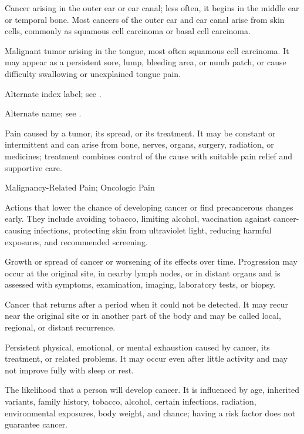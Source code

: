  Cancer arising in the outer ear or ear canal; less often, it begins in the middle ear or temporal bone. Most cancers of the outer ear and ear canal arise from skin cells, commonly as squamous cell carcinoma or basal cell carcinoma.

 Malignant tumor arising in the tongue, most often squamous cell carcinoma. It may appear as a persistent sore, lump, bleeding area, or numb patch, or cause difficulty swallowing or unexplained tongue pain.

 Alternate index label; see .

 Alternate name; see .

 Pain caused by a tumor, its spread, or its treatment. It may be constant or intermittent and can arise from bone, nerves, organs, surgery, radiation, or medicines; treatment combines control of the cause with suitable pain relief and supportive care.

\synonyms
Malignancy-Related Pain; Oncologic Pain

 Actions that lower the chance of developing cancer or find precancerous changes early. They include avoiding tobacco, limiting alcohol, vaccination against cancer-causing infections, protecting skin from ultraviolet light, reducing harmful exposures, and recommended screening.

 Growth or spread of cancer or worsening of its effects over time. Progression may occur at the original site, in nearby lymph nodes, or in distant organs and is assessed with symptoms, examination, imaging, laboratory tests, or biopsy.

 Cancer that returns after a period when it could not be detected. It may recur near the original site or in another part of the body and may be called local, regional, or distant recurrence.

 Persistent physical, emotional, or mental exhaustion caused by cancer, its treatment, or related problems. It may occur even after little activity and may not improve fully with sleep or rest.

 The likelihood that a person will develop cancer. It is influenced by age, inherited variants, family history, tobacco, alcohol, certain infections, radiation, environmental exposures, body weight, and chance; having a risk factor does not guarantee cancer.

